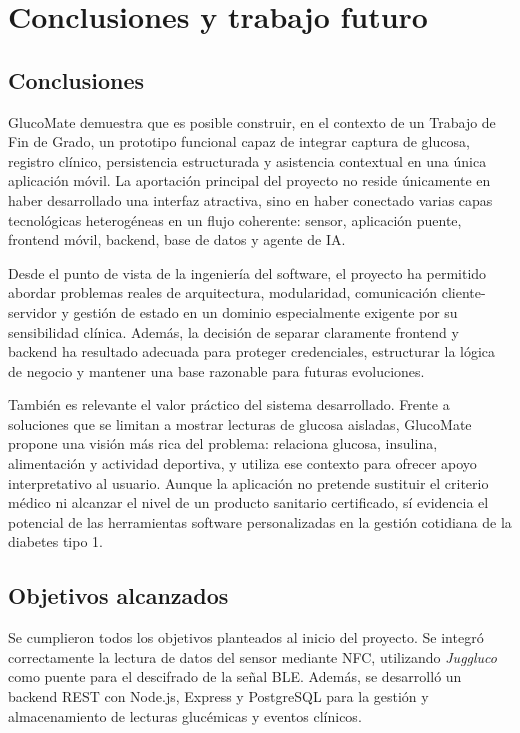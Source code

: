 \chapter{Conclusiones y trabajo futuro}\label{cap:conclusiones}

\section{Conclusiones}

GlucoMate demuestra que es posible construir, en el contexto de un Trabajo de Fin de
Grado, un prototipo funcional capaz de integrar captura de glucosa, registro clínico,
persistencia estructurada y asistencia contextual en una única aplicación móvil. La
aportación principal del proyecto no reside únicamente en haber desarrollado una interfaz
atractiva, sino en haber conectado varias capas tecnológicas heterogéneas en un flujo
coherente: sensor, aplicación puente, frontend móvil, backend, base de datos y agente de
IA.

Desde el punto de vista de la ingeniería del software, el proyecto ha permitido abordar
problemas reales de arquitectura, modularidad, comunicación cliente-servidor y gestión de
estado en un dominio especialmente exigente por su sensibilidad clínica. Además, la
decisión de separar claramente frontend y backend ha resultado adecuada para proteger
credenciales, estructurar la lógica de negocio y mantener una base razonable para futuras
evoluciones.

También es relevante el valor práctico del sistema desarrollado. Frente a soluciones que
se limitan a mostrar lecturas de glucosa aisladas, GlucoMate propone una visión más rica
del problema: relaciona glucosa, insulina, alimentación y actividad deportiva, y utiliza
ese contexto para ofrecer apoyo interpretativo al usuario. Aunque la aplicación no pretende
sustituir el criterio médico ni alcanzar el nivel de un producto sanitario certificado, sí
evidencia el potencial de las herramientas software personalizadas en la gestión cotidiana
de la diabetes tipo 1.

\section{Objetivos alcanzados}


Se cumplieron todos los objetivos planteados al inicio del proyecto. Se integró correctamente la lectura de datos del sensor mediante NFC, utilizando \textit{Juggluco} como puente para el descifrado de la señal BLE. Además, se desarrolló un backend REST con Node.js, Express y PostgreSQL para la gestión y almacenamiento de lecturas glucémicas y eventos clínicos.

